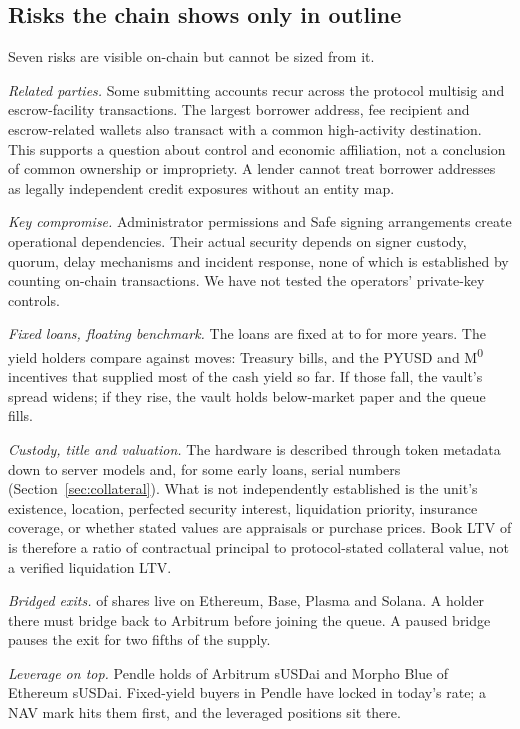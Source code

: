 \subsection{Risks the chain shows only in outline}
Seven risks are visible on-chain but cannot be sized from it.

\emph{Related parties.} Some submitting accounts recur across the protocol multisig and escrow-facility transactions. The largest borrower address, fee recipient and escrow-related wallets also transact with a common high-activity destination. This supports a question about control and economic affiliation, not a conclusion of common ownership or impropriety. A lender cannot treat \NBorrowers{} borrower addresses as \NBorrowers{} legally independent credit exposures without an entity map.

\emph{Key compromise.} Administrator permissions and Safe signing arrangements create operational dependencies. Their actual security depends on signer custody, quorum, delay mechanisms and incident response, none of which is established by counting on-chain transactions. We have not tested the operators' private-key controls.

\emph{Fixed loans, floating benchmark.} The loans are fixed at \RateMin{} to \RateMax{} for \YearsToMaturity{} more years. The yield holders compare against moves: Treasury bills, and the PYUSD and M\textsuperscript{0} incentives that supplied most of the cash yield so far. If those fall, the vault's spread widens; if they rise, the vault holds below-market paper and the queue fills.

\emph{Custody, title and valuation.} The hardware is described through token metadata down to server models and, for some early loans, serial numbers (Section~\ref{sec:collateral}). What is not independently established is the unit's existence, location, perfected security interest, liquidation priority, insurance coverage, or whether stated values are appraisals or purchase prices. Book LTV of \BookLTV{} is therefore a ratio of contractual principal to protocol-stated collateral value, not a verified liquidation LTV.

\emph{Bridged exits.} \BridgedShare{} of shares live on Ethereum, Base, Plasma and Solana. A holder there must bridge back to Arbitrum before joining the queue. A paused bridge pauses the exit for two fifths of the supply.

\emph{Leverage on top.} Pendle holds \PendleArb{} of Arbitrum sUSDai and Morpho Blue \EthMorpho{} of Ethereum sUSDai. Fixed-yield buyers in Pendle have locked in today's rate; a NAV mark hits them first, and the leveraged positions sit there.

